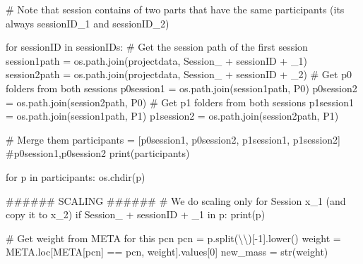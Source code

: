 \documentclass[
  letterpaper,
  DIV=11,
  numbers=noendperiod]{scrreprt}
\newenvironment{Shaded}{\begin{snugshade}}{\end{snugshade}}
\newcommand{\BuiltInTok}[1]{\textcolor[rgb]{0.00,0.23,0.31}{#1}}
\newcommand{\CharTok}[1]{\textcolor[rgb]{0.13,0.47,0.30}{#1}}
\newcommand{\CommentTok}[1]{\textcolor[rgb]{0.37,0.37,0.37}{#1}}
\newcommand{\ControlFlowTok}[1]{\textcolor[rgb]{0.00,0.23,0.31}{#1}}
\newcommand{\DecValTok}[1]{\textcolor[rgb]{0.68,0.00,0.00}{#1}}
\newcommand{\KeywordTok}[1]{\textcolor[rgb]{0.00,0.23,0.31}{#1}}
\newcommand{\NormalTok}[1]{\textcolor[rgb]{0.00,0.23,0.31}{#1}}
\newcommand{\OperatorTok}[1]{\textcolor[rgb]{0.37,0.37,0.37}{#1}}
\newcommand{\StringTok}[1]{\textcolor[rgb]{0.13,0.47,0.30}{#1}}
\begin{document}
\begin{Shaded}
\begin{Highlighting}[]
\CommentTok{\# Note that session contains of two parts that have the same participants (it\textquotesingle{}s always sessionID\_1 and sessionID\_2)}

\ControlFlowTok{for}\NormalTok{ sessionID }\KeywordTok{in}\NormalTok{ sessionIDs:}
    \CommentTok{\# Get the session path of the first session}
\NormalTok{    session1path }\OperatorTok{=}\NormalTok{ os.path.join(projectdata, }\StringTok{\textquotesingle{}Session\_\textquotesingle{}} \OperatorTok{+}\NormalTok{ sessionID }\OperatorTok{+} \StringTok{\textquotesingle{}\_1\textquotesingle{}}\NormalTok{)}
\NormalTok{    session2path }\OperatorTok{=}\NormalTok{ os.path.join(projectdata, }\StringTok{\textquotesingle{}Session\_\textquotesingle{}} \OperatorTok{+}\NormalTok{ sessionID }\OperatorTok{+} \StringTok{\textquotesingle{}\_2\textquotesingle{}}\NormalTok{)}
    \CommentTok{\# Get p0 folders from both sessions}
\NormalTok{    p0session1 }\OperatorTok{=}\NormalTok{ os.path.join(session1path, }\StringTok{\textquotesingle{}P0\textquotesingle{}}\NormalTok{)}
\NormalTok{    p0session2 }\OperatorTok{=}\NormalTok{ os.path.join(session2path, }\StringTok{\textquotesingle{}P0\textquotesingle{}}\NormalTok{)}
    \CommentTok{\# Get p1 folders from both sessions}
\NormalTok{    p1session1 }\OperatorTok{=}\NormalTok{ os.path.join(session1path, }\StringTok{\textquotesingle{}P1\textquotesingle{}}\NormalTok{)}
\NormalTok{    p1session2 }\OperatorTok{=}\NormalTok{ os.path.join(session2path, }\StringTok{\textquotesingle{}P1\textquotesingle{}}\NormalTok{)}

    \CommentTok{\# Merge them}
\NormalTok{    participants }\OperatorTok{=}\NormalTok{ [p0session1, p0session2, p1session1, p1session2] }\CommentTok{\#p0session1,p0session2}
    \BuiltInTok{print}\NormalTok{(participants)}

    \ControlFlowTok{for}\NormalTok{ p }\KeywordTok{in}\NormalTok{ participants:}
\NormalTok{        os.chdir(p)}

        \CommentTok{\#\#\#\#\#\# SCALING \#\#\#\#\#\#}
        \CommentTok{\# We do scaling only for Session x\_1 (and copy it to x\_2)}
        \ControlFlowTok{if} \StringTok{\textquotesingle{}Session\_\textquotesingle{}} \OperatorTok{+}\NormalTok{ sessionID }\OperatorTok{+} \StringTok{\textquotesingle{}\_1\textquotesingle{}} \KeywordTok{in}\NormalTok{ p:}
            \BuiltInTok{print}\NormalTok{(p)}

            \CommentTok{\# Get weight from META for this pcn}
\NormalTok{            pcn }\OperatorTok{=}\NormalTok{ p.split(}\StringTok{\textquotesingle{}}\CharTok{\textbackslash{}\textbackslash{}}\StringTok{\textquotesingle{}}\NormalTok{)[}\OperatorTok{{-}}\DecValTok{1}\NormalTok{].lower()}
\NormalTok{            weight }\OperatorTok{=}\NormalTok{ META.loc[META[}\StringTok{\textquotesingle{}pcn\textquotesingle{}}\NormalTok{] }\OperatorTok{==}\NormalTok{ pcn, }\StringTok{\textquotesingle{}weight\textquotesingle{}}\NormalTok{].values[}\DecValTok{0}\NormalTok{]}
\NormalTok{            new\_mass }\OperatorTok{=} \BuiltInTok{str}\NormalTok{(weight)}


\end{Highlighting}
\end{Shaded}
\end{document}
